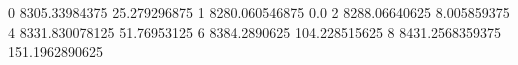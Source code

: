 0 8305.33984375 25.279296875
1 8280.060546875 0.0
2 8288.06640625 8.005859375
4 8331.830078125 51.76953125
6 8384.2890625 104.228515625
8 8431.2568359375 151.1962890625
